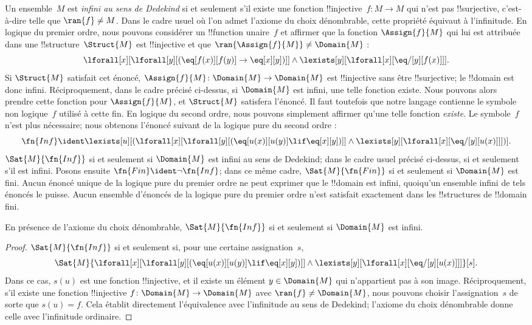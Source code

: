\documentclass[../../../include/open-logic-section]{subfiles}
\begin{document}


Un ensemble~$M$ est \emph{infini au sens de
Dedekind} si et seulement s'il existe une
fonction !!{injective}~$f\colon M\to M$ qui
n'est pas !!{surjective}, c'est-à-dire telle
que $\ran{f}\neq M$. Dans le cadre usuel où
l'on admet l'axiome du choix dénombrable,
cette propriété équivaut à l'infinitude.
En logique du premier ordre, nous pouvons
considérer un !!{function}
unaire~$f$ et affirmer que la fonction
$\Assign{f}{M}$ qui lui est attribuée dans
une !!{structure}~$\Struct{M}$ est
!!{injective} et que
$\ran{\Assign{f}{M}}\neq\Domain{M}$ :
\[
\lforall[x][\lforall[y][(\eq[f(x)][f(y)]
\to\eq[x][y])]]\land
\lexists[y][\lforall[x][\eq/[y][f(x)]]].
\]
Si $\Struct{M}$ satisfait cet énoncé,
$\Assign{f}{M}\colon\Domain{M}\to\Domain{M}$
est !!{injective} sans être !!{surjective};
le !!{domain} est donc infini.
Réciproquement, dans le cadre précisé ci-dessus,
si $\Domain{M}$ est infini, une telle fonction
existe. Nous pouvons alors prendre cette fonction
pour $\Assign{f}{M}$, et $\Struct{M}$ satisfera
l'énoncé. Il faut toutefois que notre langage
contienne le symbole non logique~$f$ utilisé
à cette fin. En logique du second ordre, nous
pouvons simplement affirmer qu'une telle
fonction \emph{existe}. Le symbole~$f$ n'est
plus nécessaire; nous obtenons l'énoncé suivant
de la logique pure du second ordre :
\[
\fn{Inf}\ident
\lexists[u][(\lforall[x][\lforall[y]
[(\eq[u(x)][u(y)]\lif\eq[x][y])]]
\land\lexists[y][\lforall[x][\eq/[y][u(x)]]])].
\]
$\Sat{M}{\fn{Inf}}$ si et seulement si
$\Domain{M}$ est infini au sens de Dedekind;
dans le cadre usuel précisé ci-dessus, si et
seulement s'il est infini. Posons ensuite
$\fn{Fin}\ident\lnot\fn{Inf}$; dans ce
même cadre, $\Sat{M}{\fn{Fin}}$ si et seulement
si $\Domain{M}$ est fini. Aucun énoncé unique
de la logique pure du premier ordre ne peut
exprimer que le !!{domain} est infini,
quoiqu'un ensemble infini de tels énoncés
le puisse. Aucun ensemble d'énoncés de la
logique pure du premier ordre n'est satisfait
exactement dans les !!{structure}s de
!!{domain} fini.

\begin{prop}
En présence de l'axiome du choix dénombrable,
$\Sat{M}{\fn{Inf}}$ si et seulement si
$\Domain{M}$ est infini.
\end{prop}

\begin{proof}
$\Sat{M}{\fn{Inf}}$ si et seulement si,
pour une certaine assignation~$s$,
\[
\Sat{M}{\lforall[x][\lforall[y]
[(\eq[u(x)][u(y)]\lif\eq[x][y])]]
\land\lexists[y][\lforall[x][\eq/[y][u(x)]]]}[s].
\]
Dans ce cas, $s(u)$ est une fonction
!!{injective}, et il existe un élément
$y\in\Domain{M}$ qui n'appartient pas à son
image. Réciproquement, s'il existe une fonction
!!{injective}
$f\colon\Domain{M}\to\Domain{M}$
avec $\ran{f}\neq\Domain{M}$, nous pouvons
choisir l'assignation~$s$ de sorte que
$s(u)=f$. Cela établit directement l'équivalence
avec l'infinitude au sens de Dedekind; l'axiome
du choix dénombrable donne celle avec
l'infinitude ordinaire.
\end{proof}
\end{document}
